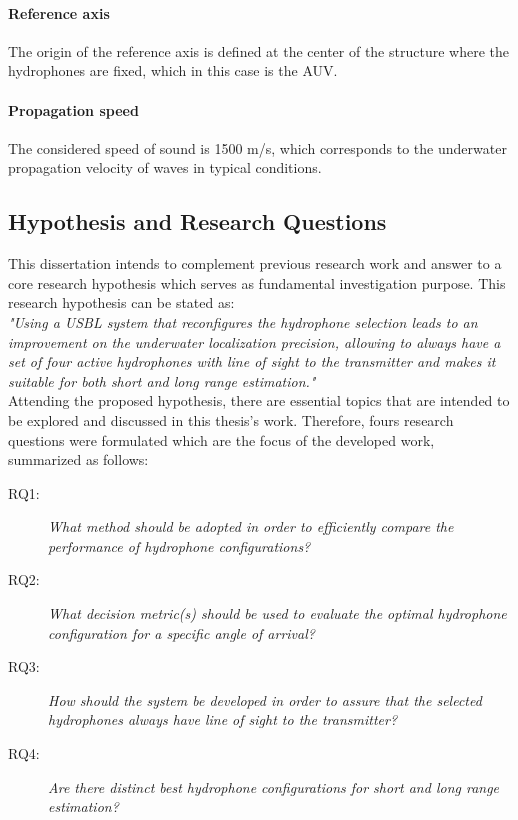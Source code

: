 \paragraph{Reference axis} The origin of the reference axis is defined at the center of the structure where the hydrophones are fixed, which in this case is the AUV.

\paragraph{Propagation speed} The considered speed of sound is 1500 m/s, which corresponds to the underwater propagation velocity of waves in typical conditions.

\subsection{Hypothesis and Research Questions} \label{sec:hypoth-rq}

This dissertation intends to complement previous research work and answer to a core research hypothesis which serves as fundamental investigation purpose. This research hypothesis can be stated as:
\\

\textit{"Using a USBL system that reconfigures the hydrophone selection leads to an improvement on the underwater localization precision, allowing to always have a set of four active hydrophones with line of sight to the transmitter and makes it suitable for both short and long range estimation."}
\\

Attending the proposed hypothesis, there are essential topics that are intended to be explored and discussed in this thesis's work. Therefore, fours research questions were formulated which are the focus of the developed work, summarized as follows:

\begin{description}
	\item[RQ1: ] \textit{What method should be adopted in order to efficiently compare the performance of hydrophone configurations?}
	
	\item[RQ2: ] \textit{What decision metric(s) should be used to evaluate the optimal hydrophone configuration for a specific angle of arrival?}
	
	\item[RQ3: ]\textit{How should the system be developed in order to assure that the selected hydrophones always have line of sight to the transmitter?}
	
	\item[RQ4: ] \textit{Are there distinct best hydrophone configurations for short and long range estimation?}
\end{description}

